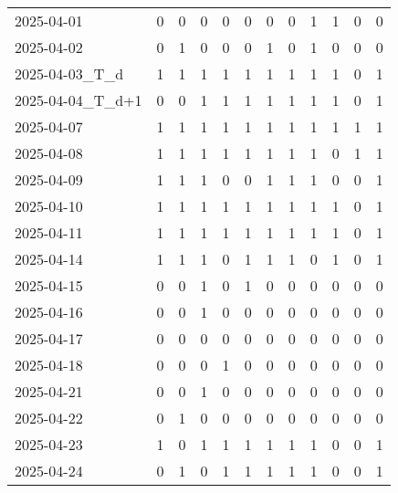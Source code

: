 \documentclass[dvipdfmx,oneside]{article}
\begin{document}
\begin{tabular}{lccccccccccc}
        2025-04-01 &     0 &     0 &     0 &     0 &     0 &     0 &     0 &     1 &     1 &     0 &     0 \\
        2025-04-02 &     0 &     1 &     0 &     0 &     0 &     1 &     0 &     1 &     0 &     0 &     0 \\
  2025-04-03\_T\_d &     1 &     1 &     1 &     1 &     1 &     1 &     1 &     1 &     1 &     0 &     1 \\
2025-04-04\_T\_d+1 &     0 &     0 &     1 &     1 &     1 &     1 &     1 &     1 &     1 &     0 &     1 \\
        2025-04-07 &     1 &     1 &     1 &     1 &     1 &     1 &     1 &     1 &     1 &     1 &     1 \\
        2025-04-08 &     1 &     1 &     1 &     1 &     1 &     1 &     1 &     1 &     0 &     1 &     1 \\
        2025-04-09 &     1 &     1 &     1 &     0 &     0 &     1 &     1 &     1 &     0 &     0 &     1 \\
        2025-04-10 &     1 &     1 &     1 &     1 &     1 &     1 &     1 &     1 &     1 &     0 &     1 \\
        2025-04-11 &     1 &     1 &     1 &     1 &     1 &     1 &     1 &     1 &     1 &     0 &     1 \\
        2025-04-14 &     1 &     1 &     1 &     0 &     1 &     1 &     1 &     0 &     1 &     0 &     1 \\
        2025-04-15 &     0 &     0 &     1 &     0 &     1 &     0 &     0 &     0 &     0 &     0 &     0 \\
        2025-04-16 &     0 &     0 &     1 &     0 &     0 &     0 &     0 &     0 &     0 &     0 &     0 \\
        2025-04-17 &     0 &     0 &     0 &     0 &     0 &     0 &     0 &     0 &     0 &     0 &     0 \\
        2025-04-18 &     0 &     0 &     0 &     1 &     0 &     0 &     0 &     0 &     0 &     0 &     0 \\
        2025-04-21 &     0 &     0 &     1 &     0 &     0 &     0 &     0 &     0 &     0 &     0 &     0 \\
        2025-04-22 &     0 &     1 &     0 &     0 &     0 &     0 &     0 &     0 &     0 &     0 &     0 \\
        2025-04-23 &     1 &     0 &     1 &     1 &     1 &     1 &     1 &     1 &     0 &     0 &     1 \\
        2025-04-24 &     0 &     1 &     0 &     1 &     1 &     1 &     1 &     1 &     0 &     0 &     1 \\

\end{tabular}
\end{document}

